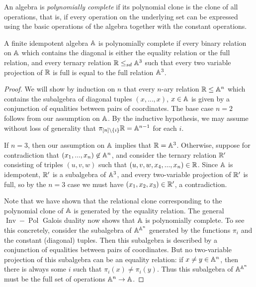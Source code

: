 \documentclass[letterpaper,11pt]{article}
\DeclareMathOperator{\Pol}{Pol}
\DeclareMathOperator{\Inv}{Inv}
\begin{document}
\begin{defn} An algebra is \emph{polynomially complete} if its polynomial clone is the clone of all operations, that is, if every operation on the underlying set can be expressed using the basic operations of the algebra together with the constant operations.
\end{defn}

\begin{thm} A finite idempotent algebra $\mathbb{A}$ is polynomially complete if every binary relation on $\mathbb{A}$ which contains the diagonal is either the equality relation or the full relation, and every ternary relation $\mathbb{R} \le_{sd} \mathbb{A}^3$ such that every two variable projection of $\mathbb{R}$ is full is equal to the full relation $\mathbb{A}^3$.
\end{thm}
\begin{proof} We will show by induction on $n$ that every $n$-ary relation $\mathbb{R} \le \mathbb{A}^n$ which contains the subalgebra of diagonal tuples $(x,...,x)$, $x \in \mathbb{A}$ is given by a conjunction of equalities between pairs of coordinates. The base case $n = 2$ follows from our assumption on $\mathbb{A}$. By the inductive hypothesis, we may assume without loss of generality that $\pi_{[n]\setminus\{i\}} \mathbb{R} = \mathbb{A}^{n-1}$ for each $i$.

If $n=3$, then our assumption on $\mathbb{A}$ implies that $\mathbb{R} = \mathbb{A}^3$. Otherwise, suppose for contradiction that $(x_1, ..., x_n) \not\in \mathbb{A}^n$, and consider the ternary relation $\mathbb{R}'$ consisting of triples $(u,v,w)$ such that $(u,v,w,x_4, ..., x_n) \in \mathbb{R}$. Since $\mathbb{A}$ is idempotent, $\mathbb{R}'$ is a subalgebra of $\mathbb{A}^3$, and every two-variable projection of $\mathbb{R}'$ is full, so by the $n=3$ case we must have $(x_1,x_2,x_3) \in \mathbb{R}'$, a contradiction.

Note that we have shown that the relational clone corresponding to the polynomial clone of $\mathbb{A}$ is generated by the equality relation. The general $\Inv-\Pol$ Galois duality now shows that $\mathbb{A}$ is polynomially complete. To see this concretely, consider the subalgebra of $\mathbb{A}^{\mathbb{A}^n}$ generated by the functions $\pi_i$ and the constant (diagonal) tuples. Then this subalgebra is described by a conjunction of equalities between pairs of coordinates. But no two-variable projection of this subalgebra can be an equality relation: if $x \ne y \in \mathbb{A}^n$, then there is always some $i$ such that $\pi_i(x) \ne \pi_i(y)$. Thus this subalgebra of $\mathbb{A}^{\mathbb{A}^n}$ must be the full set of operations $\mathbb{A}^n \rightarrow \mathbb{A}$.
\end{proof}
\end{document}

